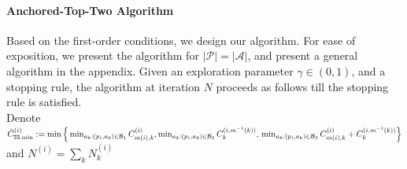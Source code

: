 \documentclass{article}
\newlength{\BoxH}
\begin{document}
\paragraph{Anchored-Top-Two Algorithm} Based on the first-order conditions, we design our algorithm. For ease of exposition, we present the algorithm for $|\mathcal{P}|=|\mathcal{A}|$, and present a general algorithm in the appendix. Given an exploration parameter $\gamma\in(0,1)$, and a stopping rule, the algorithm at iteration $N$ proceeds as follows till the stopping rule is satisfied.\\ Denote $\tilde{C}^{(i)}_{\texttt{TS},\min}:=\min\Big\{\min_{a_k:(p_i,a_k)\in \mathcal{B}_1}C^{(i)}_{m(i),k},\min_{a_k:(p_i,a_k)\in \mathcal{B}_2}C^{(i,m^{-1}(k))}_k,\\
\min_{a_k:(p_i,a_k)\in \mathcal{B}_3}C^{(i)}_{m(i),k}+C^{(i,m^{-1}(k))}_k\Big\}$ and $N^{(i)}=\sum_{k}N^{(i)}_k$
 \setlength{\BoxH}{2.4cm}  %
 \vspace{-10pt}
\end{document}
